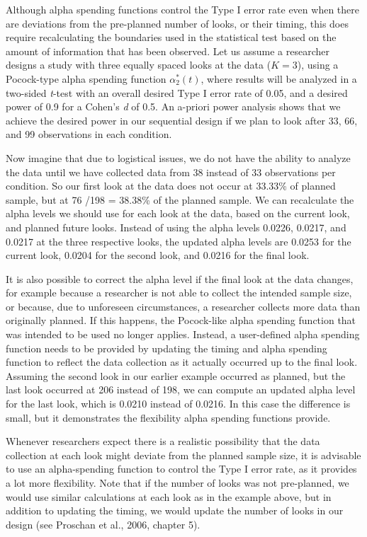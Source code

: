 \documentclass[
  english,
  ,man,floatsintext]{apa6}
\begin{document}
Although alpha spending functions control the Type I error rate even when there are deviations from the pre-planned number of looks, or their timing, this does require recalculating the boundaries used in the statistical test based on the amount of information that has been observed. Let us assume a researcher designs a study with three equally spaced looks at the data (\(K = 3\)), using a Pocock-type alpha spending function \(\alpha_2^*(t)\), where results will be analyzed in a two-sided \emph{t}-test with an overall desired Type I error rate of 0.05, and a desired power of 0.9 for a Cohen's \emph{d} of 0.5. An a-priori power analysis shows that we achieve the desired power in our sequential design if we plan to look after 33, 66, and 99 observations in each condition.

Now imagine that due to logistical issues, we do not have the ability to analyze the data until we have collected data from 38 instead of 33 observations per condition. So our first look at the data does not occur at 33.33\% of planned sample, but at 76 /198 = 38.38\% of the planned sample. We can recalculate the alpha levels we should use for each look at the data, based on the current look, and planned future looks. Instead of using the alpha levels 0.0226, 0.0217, and 0.0217 at the three respective looks, the updated alpha levels are 0.0253 for the current look, 0.0204 for the second look, and 0.0216 for the final look.

It is also possible to correct the alpha level if the final look at the data changes, for example because a researcher is not able to collect the intended sample size, or because, due to unforeseen circumstances, a researcher collects more data than originally planned. If this happens, the Pocock-like alpha spending function that was intended to be used no longer applies. Instead, a user-defined alpha spending function needs to be provided by updating the timing and alpha spending function to reflect the data collection as it actually occurred up to the final look. Assuming the second look in our earlier example occurred as planned, but the last look occurred at 206 instead of 198, we can compute an updated alpha level for the last look, which is 0.0210 instead of 0.0216. In this case the difference is small, but it demonstrates the flexibility alpha spending functions provide.

Whenever researchers expect there is a realistic possibility that the data collection at each look might deviate from the planned sample size, it is advisable to use an alpha-spending function to control the Type I error rate, as it provides a lot more flexibility. Note that if the number of looks was not pre-planned, we would use similar calculations at each look as in the example above, but in addition to updating the timing, we would update the number of looks in our design (see Proschan et al., 2006, chapter 5).
\end{document}
